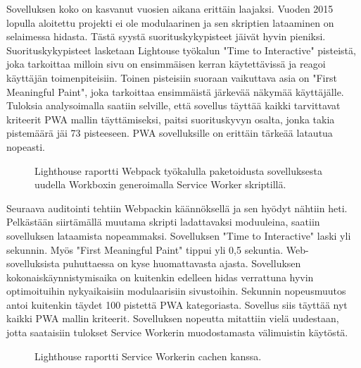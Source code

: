 \documentclass{tktltiki}
\begin{document}
\clearpage

Sovelluksen koko on kasvanut vuosien aikana erittäin laajaksi. Vuoden 2015 lopulla aloitettu projekti ei ole modulaarinen ja sen skriptien lataaminen on selaimessa hidasta. Tästä syystä suorituskykypisteet jäivät hyvin pieniksi. Suorituskykypisteet lasketaan Lightouse työkalun "Time to Interactive" pisteistä, joka tarkoittaa milloin sivu on ensimmäisen kerran käytettävissä ja reagoi käyttäjän toimenpiteisiin. Toinen pisteisiin suoraan vaikuttava asia on "First Meaningful Paint", joka tarkoittaa ensimmäistä järkevää näkymää käyttäjälle. Tuloksia analysoimalla saatiin selville, että sovellus täyttää kaikki tarvittavat kriteerit PWA mallin täyttämiseksi, paitsi suorituskyvyn osalta, jonka takia pistemäärä jäi 73 pisteeseen. PWA sovelluksille on erittäin tärkeää latautua nopeasti. 


\begin{figure}[!h]
\begin{center}
\caption{Lighthouse raportti Webpack työkalulla paketoidusta sovelluksesta uudella Workboxin generoimalla Service Worker skriptillä.}
\label{Lighthouse raportti 2}
\end{center}
\end{figure}

\clearpage

Seuraava auditointi tehtiin Webpackin käännöksellä ja sen hyödyt nähtiin heti. Pelkästään siirtämällä muutama skripti ladattavaksi moduuleina, saatiin sovelluksen lataamista nopeammaksi. Sovelluksen "Time to Interactive" laski yli sekunnin. Myös "First Meaningful Paint" tippui yli 0,5 sekuntia. Web-sovelluksista puhuttaessa on kyse huomattavasta ajasta. Sovelluksen kokonaiskäynnistymisaika on kuitenkin edelleen hidas verrattuna hyvin optimoituihin nykyaikaisiin modulaarisiin sivustoihin. Sekunnin nopeusmuutos antoi kuitenkin täydet 100 pistettä PWA kategoriasta. Sovellus siis täyttää nyt kaikki PWA mallin kriteerit. Sovelluksen nopeutta mitattiin vielä uudestaan, jotta saataisiin tulokset Service Workerin muodostamasta välimuistin käytöstä.

\begin{figure}[h]
\begin{center}
\caption{Lighthouse raportti Service Workerin cachen kanssa.}
\label{Lighthouse raportti 3}
\end{center}
\end{figure}
\end{document}
